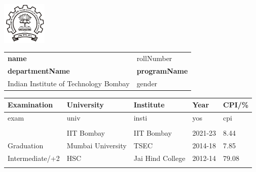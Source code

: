 \documentclass[a4paper,10pt]{article}
\begin{document}


\begin{table}
    \begin{minipage}{0.15\linewidth}
        \centering
        \includegraphics[height =0.8in]{iit_logo.png}
    \end{minipage}
    \begin{minipage}{0.65\linewidth}
        \setlength{\tabcolsep}{70pt}
        \def\arraystretch{1.15}
        \begin{tabular}{ll}
            \textbf{\Large{name}}  &  {rollNumber} \\
            \textbf{departmentName} & \textbf{programName} \\
            Indian Institute of Technology Bombay &  {gender}\\
        \end{tabular}
    \end{minipage}\hfill
\end{table}    

\setlength{\tabcolsep}{25pt}
\begin{table}
\centering
\begin{tabular}{lllll}
\toprule
\textbf{Examination}    & \textbf{University}   & \textbf{Institute}    & \textbf{Year}     & \textbf{CPI/\%} \\ 
\toprule
exam & univ & insti & yos & cpi\\
\bottomrule \\[-0.75cm]

\end{tabular}
\end{table}
\end{document}
